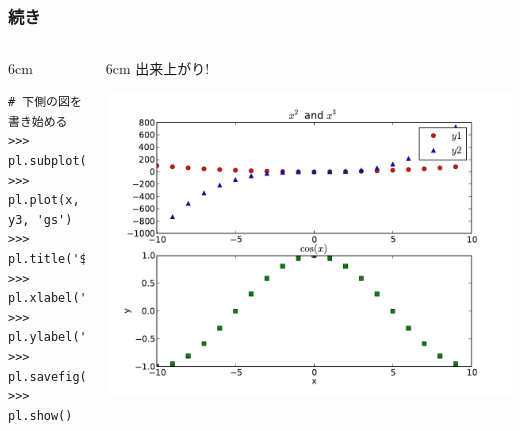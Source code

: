 \subsection*{\redm\whitem\greenb}
\begin{frame}[t,fragile]
\frametitle{続き}
\begin{columns}
\begin{column}{6cm}
\begin{lstlisting}
# 下側の図を書き始める
>>> pl.subplot(212)        
>>> pl.plot(x, y3, 'gs')
>>> pl.title('$\cos(x)$')
>>> pl.xlabel('x')
>>> pl.ylabel('y')
>>> pl.savefig('x3.pdf') 
>>> pl.show()
\end{lstlisting}
\end{column}
\begin{column}{6cm}
出来上がり!
\begin{center}
\includegraphics[width=\textwidth]{x3.pdf}
\end{center}
\end{column}
\end{columns}
\end{frame}

